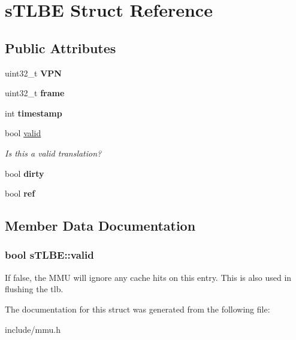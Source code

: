 \hypertarget{structsTLBE}{\section{s\-T\-L\-B\-E \-Struct \-Reference}
\label{d2/deb/structsTLBE}
}
\subsection*{\-Public \-Attributes}
\begin{DoxyCompactItemize}
\item 
\hypertarget{structsTLBE_a4010857b71377706a604c279ace18d01}{uint32\-\_\-t {\bfseries \-V\-P\-N}}\label{d2/deb/structsTLBE_a4010857b71377706a604c279ace18d01}

\item 
\hypertarget{structsTLBE_a4b59c05e37a16e8cae375f4196035c70}{uint32\-\_\-t {\bfseries frame}}\label{d2/deb/structsTLBE_a4b59c05e37a16e8cae375f4196035c70}

\item 
\hypertarget{structsTLBE_a1f482585fac2299e1c083bef6a5391ef}{int {\bfseries timestamp}}\label{d2/deb/structsTLBE_a1f482585fac2299e1c083bef6a5391ef}

\item 
bool \hyperlink{structsTLBE_a49cd068c40f5bb2698fb351d4356492e}{valid}
\begin{DoxyCompactList}\small\item\em \-Is this a valid translation? \end{DoxyCompactList}\item 
\hypertarget{structsTLBE_a9b13016950c8670388e23d5a818d3c53}{bool {\bfseries dirty}}\label{d2/deb/structsTLBE_a9b13016950c8670388e23d5a818d3c53}

\item 
\hypertarget{structsTLBE_a3d9f86a07a5cadff19239a7eaf713e71}{bool {\bfseries ref}}\label{d2/deb/structsTLBE_a3d9f86a07a5cadff19239a7eaf713e71}

\end{DoxyCompactItemize}


\subsection{\-Member \-Data \-Documentation}
\hypertarget{structsTLBE_a49cd068c40f5bb2698fb351d4356492e}{
\subsubsection[{valid}]{\setlength{\rightskip}{0pt plus 5cm}bool {\bf s\-T\-L\-B\-E\-::valid}}}\label{d2/deb/structsTLBE_a49cd068c40f5bb2698fb351d4356492e}
\-If false, the \-M\-M\-U will ignore any cache hits on this entry. \-This is also used in flushing the tlb. 

\-The documentation for this struct was generated from the following file\-:\begin{DoxyCompactItemize}
\item 
include/mmu.\-h\end{DoxyCompactItemize}
